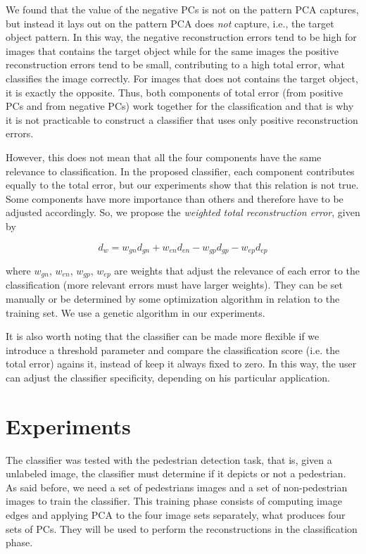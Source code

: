 \documentclass[10pt, conference, compsocconf]{IEEEtran}
\begin{document}
We found that the value of the negative PCs is not on the pattern PCA captures, but instead it lays out on the pattern PCA does \emph{not} capture, i.e., the target object pattern. In this way, the negative reconstruction errors tend to be high for images that contains the target object while for the same images the positive reconstruction errors tend to be small, contributing to a high total error, what classifies the image correctly. For images that does not contains the target object, it is exactly the opposite. Thus, both components of total error (from positive PCs and from negative PCs) work together for the classification and that is why it is not practicable to construct a classifier that uses only positive reconstruction errors.

However, this does not mean that all the four components have the same relevance to classification. In the proposed classifier, each component contributes equally to the total error, but our experiments show that this relation is not true. Some components have more importance than others and therefore have to be adjusted accordingly. So, we propose the \emph{weighted total reconstruction error}, given by

\begin{equation}
  d_w = w_{gn} d_{gn} + w_{en} d_{en} - w_{gp} d_{gp} - w_{ep} d_{ep}
  \label{weighted_total_error}
\end{equation}

\noindent where $w_{gn}$, $w_{en}$, $w_{gp}$, $w_{ep}$ are weights that adjust the relevance of each error to the classification (more relevant errors must have larger weights). They can be set manually or be determined by some optimization algorithm in relation to the training set. We use a genetic algorithm in our experiments.

It is also worth noting that the classifier can be made more flexible if we introduce a threshold parameter and compare the classification score (i.e. the total error) agains it, instead of keep it always fixed to zero. In this way, the user can adjust the classifier specificity, depending on his particular application.


\section{Experiments}

The classifier was tested with the pedestrian detection task, that is, given a unlabeled image, the classifier must determine if it depicts or not a pedestrian. As said before, we need a set of pedestrians images and a set of non-pedestrian images to train the classifier. This training phase consists of computing image edges and applying PCA to the four image sets separately, what produces four sets of PCs. They will be used to perform the reconstructions in the classification phase.
\end{document}
